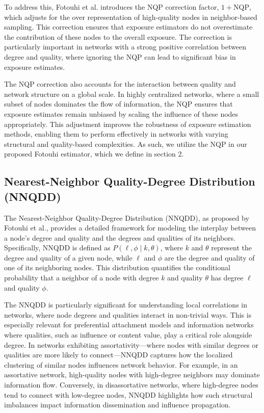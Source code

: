 \documentclass{article}
\begin{document}
To address this, Fotouhi et al. introduces the NQP correction factor, \( 1 + \text{NQP} \), which adjusts for the over representation of high-quality nodes in neighbor-based sampling. This correction ensures that exposure estimators do not overestimate the contribution of these nodes to the overall exposure. The correction is particularly important in networks with a strong positive correlation between degree and quality, where ignoring the NQP can lead to significant bias in exposure estimates.

The NQP correction also accounts for the interaction between quality and network structure on a global scale. In highly centralized networks, where a small subset of nodes dominates the flow of information, the NQP ensures that exposure estimates remain unbiased by scaling the influence of these nodes appropriately. This adjustment improves the robustness of exposure estimation methods, enabling them to perform effectively in networks with varying structural and quality-based complexities. As such, we utilize the NQP in our proposed Fotouhi estimator, which we define in section 2.

\subsection{Nearest-Neighbor Quality-Degree Distribution (NNQDD)} 

The Nearest-Neighbor Quality-Degree Distribution (NNQDD), as proposed by Fotouhi et al., provides a detailed framework for modeling the interplay between a node’s degree and quality and the degrees and qualities of its neighbors. Specifically, NNQDD is defined as \( P(\ell, \phi \mid k, \theta) \), where \( k \) and \( \theta \) represent the degree and quality of a given node, while \( \ell \) and \( \phi \) are the degree and quality of one of its neighboring nodes. This distribution quantifies the conditional probability that a neighbor of a node with degree \( k \) and quality \( \theta \) has degree \( \ell \) and quality \( \phi \). 

The NNQDD is particularly significant for understanding local correlations in networks, where node degrees and qualities interact in non-trivial ways. This is especially relevant for preferential attachment models and information networks where qualities, such as influence or content value, play a critical role alongside degree. In networks exhibiting assortativity---where nodes with similar degrees or qualities are more likely to connect---NNQDD captures how the localized clustering of similar nodes influences network behavior. For example, in an assortative network, high-quality nodes with high-degree neighbors may dominate information flow. Conversely, in disassortative networks, where high-degree nodes tend to connect with low-degree nodes, NNQDD highlights how such structural imbalances impact information dissemination and influence propagation.
\end{document}
